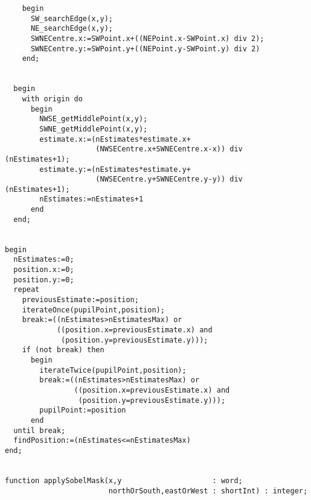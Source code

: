 \begin{verbatim}
    begin
      SW_searchEdge(x,y);
      NE_searchEdge(x,y);
      SWNECentre.x:=SWPoint.x+((NEPoint.x-SWPoint.x) div 2);
      SWNECentre.y:=SWPoint.y+((NEPoint.y-SWPoint.y) div 2)
    end;


  begin
    with origin do
      begin
        NWSE_getMiddlePoint(x,y);
        SWNE_getMiddlePoint(x,y);
        estimate.x:=(nEstimates*estimate.x+
                     (NWSECentre.x+SWNECentre.x-x)) div (nEstimates+1);
        estimate.y:=(nEstimates*estimate.y+
                     (NWSECentre.y+SWNECentre.y-y)) div (nEstimates+1);
        nEstimates:=nEstimates+1
      end
  end;


begin
  nEstimates:=0;
  position.x:=0;
  position.y:=0;
  repeat
    previousEstimate:=position;
    iterateOnce(pupilPoint,position);
    break:=((nEstimates>nEstimatesMax) or
            ((position.x=previousEstimate.x) and
             (position.y=previousEstimate.y)));
    if (not break) then
      begin
        iterateTwice(pupilPoint,position);
        break:=((nEstimates>nEstimatesMax) or
                ((position.x=previousEstimate.x) and
                 (position.y=previousEstimate.y)));
        pupilPoint:=position
      end
  until break;
  findPosition:=(nEstimates<=nEstimatesMax)
end;


function applySobelMask(x,y                     : word;
                        northOrSouth,eastOrWest : shortInt) : integer;


\end{verbatim}
